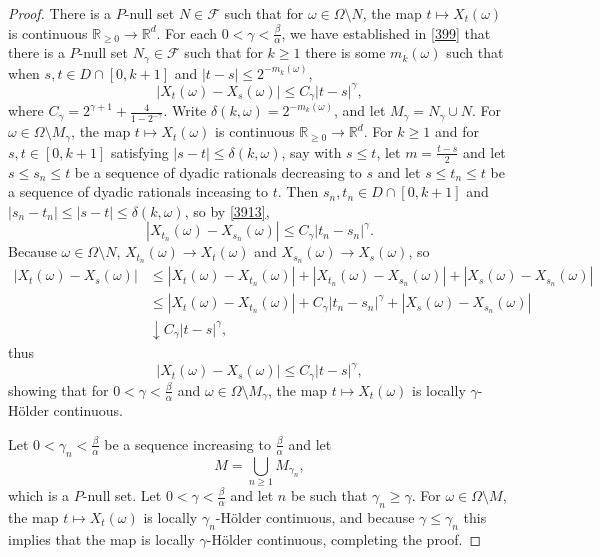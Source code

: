 \documentclass{article}
\theoremstyle{definition}
\theoremstyle{definition}
\begin{document}
\begin{proof}
There is a $P$-null set $N \in \mathscr{F}$ such that for $\omega \in \Omega \setminus N$, the map
$t \mapsto X_t(\omega)$ is continuous $\mathbb{R}_{\geq 0} \to \mathbb{R}^d$. 
For each $0<\gamma<\frac{\beta}{\alpha}$, we have established in \eqref{399} that there is a $P$-null set
$N_\gamma \in \mathscr{F}$ such that for $k \geq 1$ 
there is some $m_k(\omega)$ such that when 
 $s,t \in D \cap [0,k+1]$ and $|t-s| \leq 2^{-m_k(\omega)}$,
 \begin{equation}
 |X_t(\omega)-X_s(\omega)| \leq C_\gamma |t-s|^\gamma,
 \label{3913}
 \end{equation}
 where $C_\gamma = 2^{\gamma+1}+\frac{4}{1-2^{-\gamma}}$. 
 Write  $\delta(k,\omega) = 2^{-m_k(\omega)}$, and
 let $M_\gamma = N_\gamma \cup N$.
 For $\omega \in \Omega \setminus M_\gamma$, the map $t \mapsto 
 X_t(\omega)$ is continuous $\mathbb{R}_{\geq 0} \to \mathbb{R}^d$. 
 For $k \geq 1$ and for $s,t \in [0,k+1]$ satisfying $|s-t| \leq \delta(k,\omega)$, say with $s \leq t$,
let $m=\frac{t-s}{2}$ and let
$s\leq s_n \leq t$ be a sequence of dyadic rationals decreasing to $s$ and let
$s \leq t_n \leq t$ be a sequence of dyadic rationals inceasing to $t$. 
Then $s_n,t_n \in D \cap [0,k+1]$
and $|s_n-t_n| \leq |s-t| \leq \delta(k,\omega)$,  
 so  by \eqref{3913}, 
 \[
 |X_{t_n}(\omega)-X_{s_n}(\omega)| \leq C_\gamma |t_n-s_n|^\gamma.
 \]
Because $\omega \in \Omega \setminus N$, $X_{t_n}(\omega) \to X_t(\omega)$ and
$X_{s_n}(\omega) \to X_s(\omega)$, so
\begin{align*}
|X_t(\omega)-X_s(\omega)|& \leq |X_t(\omega)-X_{t_n}(\omega)|
+|X_{t_n}(\omega)-X_{s_n}(\omega)|+|X_s(\omega)-X_{s_n}(\omega)|\\
&\leq |X_t(\omega)-X_{t_n}(\omega)|+C_\gamma |t_n-s_n|^\gamma+|X_s(\omega)-X_{s_n}(\omega)|\\
&\downarrow C_\gamma |t-s|^\gamma,
\end{align*}
thus
\[
|X_t(\omega)-X_s(\omega)| \leq C_\gamma |t-s|^\gamma,
\]
showing that for  $0<\gamma<\frac{\beta}{\alpha}$ and 
$\omega \in \Omega \setminus M_\gamma$, the map $t \mapsto X_t(\omega)$ is locally
$\gamma$-H\"older continuous. 

Let $0<\gamma_n<\frac{\beta}{\alpha}$ be a sequence increasing to $\frac{\beta}{\alpha}$ and let 
\[
M = \bigcup_{n \geq 1} M_{\gamma_n},
\]
which is a $P$-null set. 
Let $0<\gamma<\frac{\beta}{\alpha}$ and let $n$ be such that $\gamma_n \geq \gamma$.
For $\omega \in \Omega \setminus M$, the map
$t \mapsto X_t(\omega)$ is locally $\gamma_n$-H\"older continuous, and because
$\gamma \leq \gamma_n$ this implies that the map is locally $\gamma$-H\"older continuous, completing the proof.
\end{proof}
\end{document}
